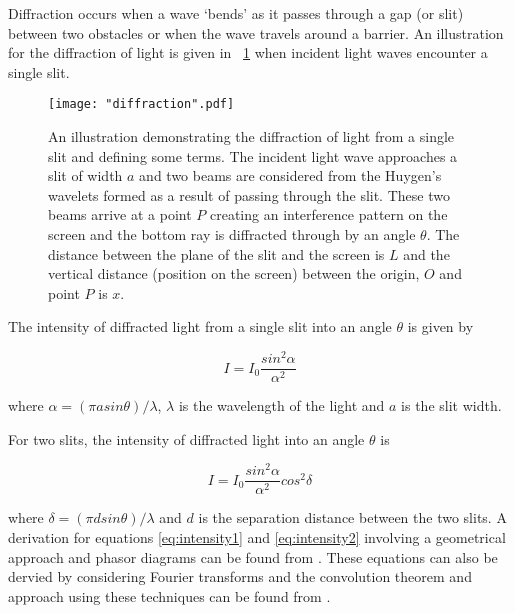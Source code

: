 \documentclass{article}
\newcommand{\figref}[2][\figurename~]{#1\ref{#2}}
\begin{document}
\vspace{2mm}
\noindent
Diffraction occurs when a wave `bends' as it passes through a gap (or slit) between two obstacles or when the wave travels around a barrier. An illustration for the diffraction of light is given in \figref{fig:diffraction} when incident light waves encounter a single slit.

\begin{figure}[h]
\centering
\texttt{[image: "diffraction".pdf]}
\caption{An illustration demonstrating the diffraction of light from a single slit and defining some terms. The incident light wave approaches a slit of width $a$ and two beams are considered from the Huygen's wavelets \cite{Book01} formed as a result of passing through the slit. These two beams arrive at a point $P$ creating an interference pattern on the screen and the bottom ray is diffracted through by an angle $\theta$. The distance between the plane of the slit and the screen is $L$ and the vertical distance (position on the screen) between the origin, $O$ and point $P$ is $x$. }
\label{fig:diffraction}
\end{figure}

\newpage
\vspace{2mm}
\noindent
The intensity of diffracted light from a single slit into an angle $\theta$ \cite{Paper02} is given by

\begin{equation}
\label{eq:intensity1}
I = I_0 \frac{sin^2{\alpha}}{\alpha^2}
\end{equation}

\vspace{2mm}
\noindent
where $\alpha = ({\pi asin{\theta}}) / {\lambda}$, $\lambda$ is the wavelength of the light and $a$ is the slit width.

\vspace{2mm}
\noindent
For two slits, the intensity of diffracted light into an angle $\theta$ \cite{Paper02} is

\begin{equation}
\label{eq:intensity2}
I = I_0 \frac{sin^2{\alpha}}{\alpha^2} cos^2{\delta}
\end{equation}

\vspace{2mm}
\noindent
where $\delta = ({\pi dsin{\theta}}) / {\lambda}$ and $d$ is the separation distance between the two slits. A derivation for equations \eqref{eq:intensity1} and \eqref{eq:intensity2} involving a geometrical approach and phasor diagrams can be found from \cite{Book01}. These equations can also be dervied by considering Fourier transforms and the convolution theorem and approach using these techniques can be found from \cite{Web01}.
\end{document}
